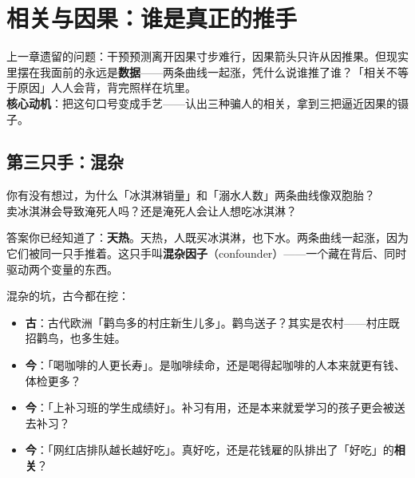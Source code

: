 \documentclass[../../main2.tex]{subfiles}
\begin{document}
\chapter{相关与因果：谁是真正的推手}
\label{ch:causation}

\begin{motivation}
	上一章遗留的问题：干预预测离开因果寸步难行，因果箭头只许从因推果。但现实里摆在我面前的永远是\textbf{数据}——两条曲线一起涨，凭什么说谁推了谁？「相关不等于原因」人人会背，背完照样在坑里。\\
	\textbf{核心动机}：把这句口号变成手艺——认出三种骗人的相关，拿到三把逼近因果的镊子。
\end{motivation}

\begin{logicmap}
\end{logicmap}

\section{第三只手：混杂}

\begin{readingnote}
	你有没有想过，为什么「冰淇淋销量」和「溺水人数」两条曲线像双胞胎？\\
	卖冰淇淋会导致淹死人吗？还是淹死人会让人想吃冰淇淋？
\end{readingnote}

答案你已经知道了：\textbf{天热}。天热，人既买冰淇淋，也下水。两条曲线一起涨，因为它们被同一只手推着。这只手叫\textbf{混杂因子}（confounder）——一个藏在背后、同时驱动两个变量的东西。

混杂的坑，古今都在挖：

\begin{itemize}
	\item \textbf{古}：古代欧洲「鹳鸟多的村庄新生儿多」。鹳鸟送子？其实是农村——村庄既招鹳鸟，也多生娃。
	\item \textbf{今}：「喝咖啡的人更长寿」。是咖啡续命，还是喝得起咖啡的人本来就更有钱、体检更多？
	\item \textbf{今}：「上补习班的学生成绩好」。补习有用，还是本来就爱学习的孩子更会被送去补习？
	\item \textbf{今}：「网红店排队越长越好吃」。真好吃，还是花钱雇的队排出了「好吃」的\textbf{相关}？
\end{itemize}
\end{document}
